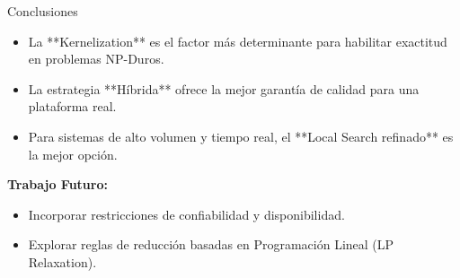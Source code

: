 \documentclass[10pt]{beamer}
\begin{document}
\begin{frame}{Conclusiones}
    \begin{itemize}
        \item La **Kernelization** es el factor más determinante para habilitar exactitud en problemas NP-Duros.
        \item La estrategia **Híbrida** ofrece la mejor garantía de calidad para una plataforma real.
        \item Para sistemas de alto volumen y tiempo real, el **Local Search refinado** es la mejor opción.
    \end{itemize}
    \textbf{Trabajo Futuro:}
    \begin{itemize}
        \item Incorporar restricciones de confiabilidad y disponibilidad.
        \item Explorar reglas de reducción basadas en Programación Lineal (LP Relaxation).
    \end{itemize}
\end{frame}

\begin{frame}
	\titlepage
\end{frame}
\end{document}
